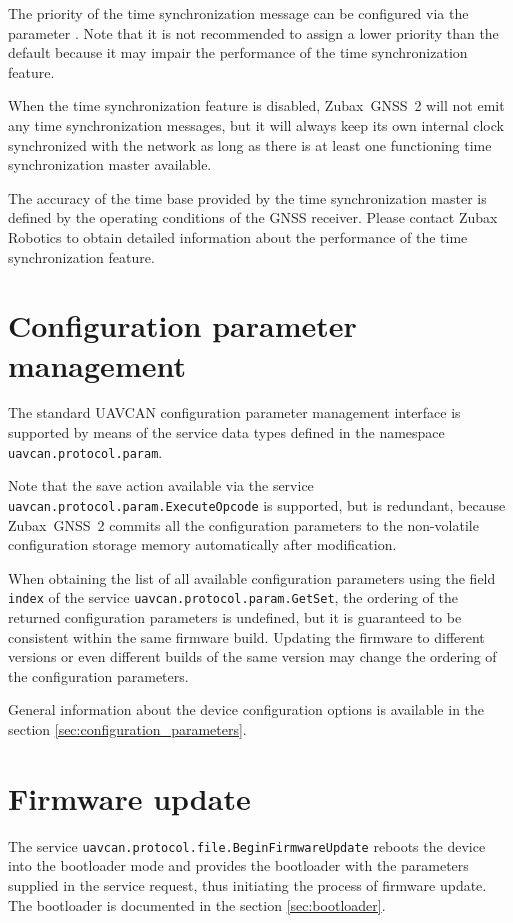 \documentclass{zubaxdoc}
\begin{document}
The priority of the time synchronization message can be configured via the parameter
.
Note that it is not recommended to assign a lower priority than the default because it may impair
the performance of the time synchronization feature.

When the time synchronization feature is disabled,
Zubax~GNSS~2 will not emit any time synchronization messages,
but it will always keep its own internal clock synchronized with the network
as long as there is at least one functioning time synchronization master available.

The accuracy of the time base provided by the time synchronization master is defined by the
operating conditions of the GNSS receiver.
Please contact Zubax Robotics to obtain detailed information about the performance of the
time synchronization feature.

\section{Configuration parameter management}

The standard UAVCAN configuration parameter management interface is supported
by means of the service data types defined in the namespace \verb|uavcan.protocol.param|.

Note that the save action available via the service \verb|uavcan.protocol.param.ExecuteOpcode|
is supported, but is redundant, because Zubax~GNSS~2 commits all the configuration parameters
to the non-volatile configuration storage memory automatically after modification.

When obtaining the list of all available configuration parameters using the field \verb|index|
of the service \verb|uavcan.protocol.param.GetSet|, the ordering of the returned configuration
parameters is undefined, but it is guaranteed to be consistent within the same firmware build.
Updating the firmware to different versions or even different builds of the same version
may change the ordering of the configuration parameters.

General information about the device configuration options is available in the section 
\ref{sec:configuration_parameters}.

\section{Firmware update}

The service \verb|uavcan.protocol.file.BeginFirmwareUpdate| reboots the device into the bootloader
mode and provides the bootloader with the parameters supplied in the service request,
thus initiating the process of firmware update.
The bootloader is documented in the section \ref{sec:bootloader}.
\end{document}

